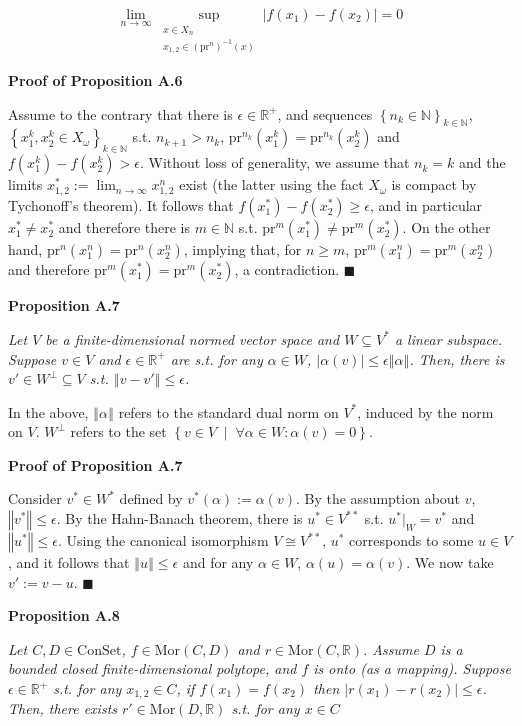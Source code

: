 \documentclass[a4paper]{article}
\newcommand{\Co}[1]{}
\newcommand{\AP}[1]{\left(#1\right)}
\newcommand{\AC}[1]{\left\{#1\right\}}
\newcommand{\ACM}[2]{\left\{#1\;\middle\vert\;#2\right\}}
\newcommand{\Nats}{\mathbb{N}}
\newcommand{\Reals}{\mathbb{R}}
\newcommand{\Mor}{\mathrm{Mor}}
\newcommand{\Lim}[1]{\lim_{#1 \rightarrow \infty}}
\newcommand{\Abs}[1]{\left\vert #1 \right\vert}
\newcommand{\Norm}[1]{\left\Vert #1 \right\Vert}
\newcommand{\Con}{{\boldsymbol{\mathrm{ConSet}}}}
\newcommand{\Prj}{\mathrm{pr}}
\begin{document}
$$\Lim{n}\sup_{\substack{x\in X_n\\x_{1,2}\in\AP{\Prj^n}^{-1}(x)}}\Abs{f\AP{x_1}-f\AP{x_2}}=0$$

\textbf{Proof of Proposition A.6}\Co{b}

Assume to the contrary that there is $\epsilon\in\Reals^+$, and sequences $\AC{n_k\in\Nats}_{k\in\Nats}$, $\AC{x_1^k,x_2^k\in X_\omega}_{k\in\Nats}$ s.t. $n_{k+1}>n_k$, $\Prj^{n_k}\AP{x_1^k}=\Prj^{n_k}\AP{x_2^k}$ and $f\AP{x_1^k}-f\AP{x_2^k}>\epsilon$. Without loss of generality, we assume that $n_k=k$ and the limits $x_{1,2}^*:=\Lim{n}x_{1,2}^n$ exist (the latter using the fact $X_\omega$ is compact by Tychonoff's theorem). It follows that $f\AP{x_1^*}-f\AP{x_2^*}\geq\epsilon$, and in particular $x_1^*\ne x_2^*$ and therefore there is $m\in\Nats$ s.t. $\Prj^m\AP{x_1^*}\ne\Prj^m\AP{x_2^*}$. On the other hand, $\Prj^{n}\AP{x_1^n}=\Prj^{n}\AP{x_2^n}$, implying that, for $n\geq m$, $\Prj^{m}\AP{x_1^n}=\Prj^{m}\AP{x_2^n}$ and therefore $\Prj^m\AP{x_1^*}=\Prj^m\AP{x_2^*}$, a contradiction. $\blacksquare$

\textbf{Proposition A.7}\Co{b}

\textit{Let $V$ be a finite-dimensional normed vector space and $W\subseteq V^*$ a linear subspace. Suppose $v\in V$ and $\epsilon\in\Reals^+$ are s.t. for any $\alpha\in W$, $\Abs{\alpha(v)} \leq \epsilon\Norm{\alpha}$. Then, there is $v'\in W^\bot\subseteq V$ s.t. $\Norm{v-v'}\leq\epsilon$.}\Co{i}

In the above, $\Norm{\alpha}$ refers to the standard dual norm on $V^*$, induced by the norm on $V$. $W^\bot$ refers to the set $\ACM{v\in V}{\forall\alpha\in W: \alpha(v)=0}$.

\textbf{Proof of Proposition A.7}\Co{b}

Consider $v^*\in W^*$ defined by $v^*(\alpha):=\alpha(v)$. By the assumption about $v$, $\Norm{v^*}\leq\epsilon$. By the Hahn-Banach theorem, there is $u^*\in V^{**}$ s.t. $u^*|_W=v^*$ and $\Norm{u^*}\leq\epsilon$. Using the canonical isomorphism $V\cong V^{**}$, $u^*$ corresponds to some $u\in V$, and it follows that $\Norm{u}\leq\epsilon$ and for any $\alpha\in W$, $\alpha(u)=\alpha(v)$. We now take $v':=v-u$. $\blacksquare$

\textbf{Proposition A.8}\Co{b}

\textit{Let $C,D\in\Con$, $f\in\Mor(C,D)$ and $r\in\Mor\AP{C,\Reals}$. Assume $D$ is a bounded closed finite-dimensional polytope, and $f$ is onto (as a mapping). Suppose $\epsilon\in\Reals^+$ s.t. for any $x_{1,2}\in C$, if $f\AP{x_1}=f\AP{x_2}$ then $\Abs{r\AP{x_1}-r\AP{x_2}} \leq \epsilon$. Then, there exists $r'\in\Mor\AP{D,\Reals}$ s.t. for any $x\in C$}\Co{i} 
\end{document}
